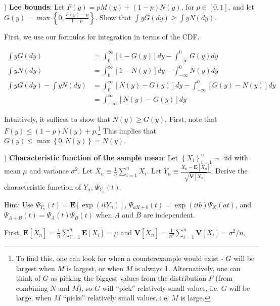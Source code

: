 \documentclass[12pt,english]{article}
\begin{document}
\vspace{1em}
) \textbf{Lee bounds}: Let $F(y) = pM(y) + (1 - p)N(y)$, for $p \in [0, 1]$, and let $G(y) = \max \left\{ 0, \frac{F(y) - p}{1 - p} \right\}$. Show that $\int y G(dy) \geq \int y N(dy)$.
\vspace{1em}

First, we use our formulas for integration in terms of the CDF.

\begin{align*}
\int y G(dy) & = \int_{0}^{\infty} [1 - G(y)] dy - \int_{-\infty}^{0} G(y) dy \\
\int y N(dy) & = \int_{0}^{\infty} [1 - N(y)] dy - \int_{-\infty}^{0} N(y) dy \\
\int y G(dy) - \int y N(dy) & = \int_{0}^{\infty} [N(y) - G(y)] dy - \int_{-\infty}^{0} [G(y) - N(y)] dy \\
& = \int_{-\infty}^{\infty} [N(y) - G(y)] dy
\end{align*}

Intuitively, it suffices to show that $N(y) \geq G(y)$. First, note that $F(y) \leq (1 - p) N(y) + p$.\footnote{To find this, one can look for when a counterexample would exist - $G$ will be largest when $M$ is largest, or when $M$ is always 1. Alternatively, one can think of $G$ as picking the biggest values from the distribution $F$ (from combining $N$ and $M$), so $G$ will ``pick'' relatively small values, i.e. $G$ will be large, when $M$ ``picks'' relatively small values, i.e. $M$ is large.} This implies that $G(y) \leq \max \left\{ 0, N(y) \right\} = N(y)$.


\vspace{1em}
) \textbf{Characteristic function of the sample mean}: Let $\left\{ X_{i} \right\}_{i=1}^{n} \sim$ iid with mean $\mu$ and variance $\sigma^{2}$. Let $\overline{X}_{n} \equiv \frac{1}{n} \sum_{i=1}^{n} X_{i}$. Let $Y_{n} \equiv \frac{\overline{X}_{n} - \mathbf{E} \left[\overline{X}_{n} \right]}{\sqrt{\mathbf{V} \left[ \overline{X}_{n} \right]}}$. Derive the characteristic function of $Y_{n}$, $\Psi_{Y_{n}}(t)$.

Hint: Use $\Psi_{Y_{n}}(t) = \mathbf{E}[\exp(itY_{n})]$, $\Psi_{aX + b}(t) = \exp(itb) \Psi_{X}(at)$, and $\Psi_{A + B}(t) = \Psi_{A}(t) \Psi_{B}(t)$ when $A$ and $B$ are independent.
\vspace{1em}

First, $\mathbf{E}[\overline{X}_{n}] = \frac{1}{n} \sum_{i=1}^{n} \mathbf{E}[X_{i}] = \mu$ and $\mathbf{V}[\overline{X}_{n}] = \frac{1}{n^{2}} \sum_{i=1}^{n} \mathbf{V}[X_{i}] = \sigma^{2} / n$.
\end{document}
